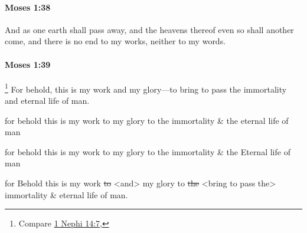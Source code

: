 
		\paragraph{Moses 1:38} %
			\label{MOSES-1-38}

			And as one earth shall pass away, and the heavens thereof even so shall another come, and there is no end to my works, neither to my words.


		\paragraph{Moses 1:39} %
			\label{MOSES-1-39}
			
				\footnote{%
					Compare \hyperref[1NEPHI-14-7]{1 Nephi 14:7}, 
					}%
			For behold, this is my work and my glory---to bring to pass the immortality and eternal life of man.
			
			\begin{framed}
			\scriptsize
				\begin{compactdesc}
					\item[OTR1] for behold this is my work to my glory to the immortality \& the eternal life of man
					\item[OTRJW] for behold this is my work to my glory to the immortality \& the Eternal life of man
					\item[OTR2] for Behold this is my work \sout{to} <and> my glory to \sout{the} <bring to pass the> immortality \& eternal life of man.
				\end{compactdesc}
			\end{framed}

